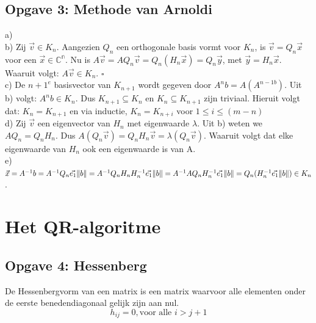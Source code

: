 \documentclass[a4paper]{article}
\newcommand*{\qed}{\hfill\ensuremath{\square}}
\newcommand{\opgave}[1]{\subsection{Opgave #1}}
\begin{document}
\opgave{3: Methode van Arnoldi}\label{sec:oef3}
a)  \\
\newline
b)  Zij $\vec{v} \in K_n$. Aangezien $Q_n$ een orthogonale basis vormt voor $K_n$, is $\vec{v} = Q_n\vec{x}$ voor een $\vec{x} \in \mathbb{C^{\text{n}}}$. Nu is $A \vec{v} = AQ_n\vec{v} = Q_n(H_n\vec{x}) = Q_n\vec{y}$, met $\vec{y} = H_n\vec{x} $.  Waaruit volgt: $A\vec{v} \in K_n$. \qed\\
\newline
c) De $n+1^e$ basisvector van $K_{n+1}$ wordt gegeven door $ A^nb = A(A^{n-1b}) $. Uit b) volgt: $A^nb \in K_n$. Dus $K_{n+1} \subseteq K_n$ en $K_{n} \subseteq K_{n+1}$ zijn triviaal. Hieruit volgt dat: $K_n = K_{n+1}$ en via inductie, $K_n = K_{n+i}$ voor $1 \leq i \leq (m-n)$\\
\newline
d) Zij $\vec{v}$ een eigenvector van $H_n$ met eigenwaarde $\lambda$. Uit b) weten we $AQ_n = Q_nH_n$. Dus $A(Q_n\vec{v}) = Q_nH_n\vec{v} = \lambda(Q_n\vec{v})$. Waaruit volgt dat elke eigenwaarde van $H_n$ ook een eigenwaarde is van A.\\
\newline
e) $\vec{x} = A^{-1}b = A^{-1}Q_n\vec{e_1}\norm{b} = A^{-1}Q_nH_nH_n^{-1}\vec{e_1}\norm{b} = A^{-1}AQ_nH_n^{-1}\vec{e_1}\norm{b} = Q_n(H_n^{-1}\vec{e_1}\norm{b}) \in K_n$.

\section{Het QR-algoritme}\label{sec:QR}

\opgave{4: Hessenberg}\label{sec:oef4}

De Hessenbergvorm van een matrix is een matrix waarvoor alle elementen onder de eerste benedendiagonaal gelijk zijn aan nul.
\begin{equation}\nonumber
	h_{ij} =0 , \text{voor alle } i > j+1
\end{equation}
\end{document}
